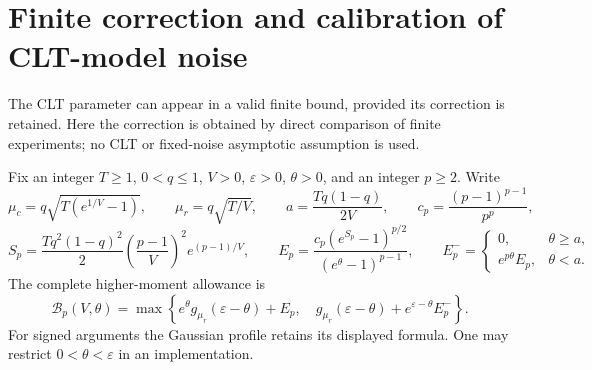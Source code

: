 \documentclass[11pt]{article}
\begin{document}
\section{Finite correction and calibration of CLT-model noise}
\label{sec:finite-correction}
The CLT parameter can appear in a valid finite bound, provided its correction
is retained. Here the correction is obtained by direct comparison of finite
experiments; no CLT or fixed-noise asymptotic assumption is used.

Fix an integer $T\ge1$, $0<q\le1$, $V>0$, $\varepsilon>0$, $\theta>0$, and an integer
$p\ge2$. Write
\[
 \mu_c=q\sqrt{T(e^{1/V}-1)},\qquad \mu_r=q\sqrt{T/V},\qquad
 a=\frac{Tq(1-q)}{2V},\qquad c_p=\frac{(p-1)^{p-1}}{p^p},
\]
\[
 S_p=\frac{Tq^2(1-q)^2}{2}
       \left(\frac{p-1}{V}\right)^2 e^{(p-1)/V},\qquad
 E_p=\frac{c_p(e^{S_p}-1)^{p/2}}{(e^\theta-1)^{p-1}},\qquad
 E_p^-=
 \begin{cases}0,&\theta\ge a,\\ e^{p\theta}E_p,&\theta<a.\end{cases}
\]
The complete higher-moment allowance is
\begin{equation}\label{eq:finite-correction-budget}
 \mathcal B_p(V,\theta)=\max\left\{
 e^\theta g_{\mu_r}(\varepsilon-\theta)+E_p,\quad
 g_{\mu_r}(\varepsilon-\theta)+e^{\varepsilon-\theta}E_p^-
 \right\}.
\end{equation}
For signed arguments the Gaussian profile retains its displayed formula.
One may restrict $0<\theta<\varepsilon$ in an implementation.
\end{document}
